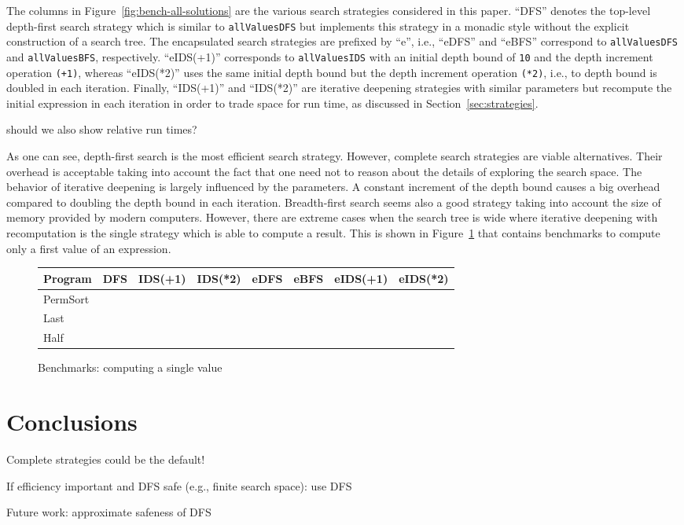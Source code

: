 \documentclass[english]{lni}
\newcommand{\code}[1]{\texttt{\small{}#1}}
\begin{document}
The columns in Figure~\ref{fig:bench-all-solutions}
are the various search strategies considered in this paper.
``DFS'' denotes the top-level depth-first search strategy
which is similar to \code{allValuesDFS} but implements
this strategy in a monadic style without the explicit
construction of a search tree.
The encapsulated search strategies are prefixed by ``e'',
i.e., ``eDFS'' and ``eBFS'' correspond to \code{allValuesDFS}
and \code{allValuesBFS}, respectively.
``eIDS(+1)'' corresponds to \code{allValuesIDS}
with an initial depth bound of \code{10} and the depth increment
operation \code{(+1)}, whereas ``eIDS(*2)'' uses the same initial depth bound
but the depth increment operation \code{(*2)}, i.e., to depth bound
is doubled in each iteration.
Finally, ``IDS(+1)'' and ``IDS(*2)'' are iterative deepening
strategies with similar parameters but recompute the initial
expression in each iteration in order to trade space for run time,
as discussed in Section~\ref{sec:strategies}.

{\sc should we also show relative run times?}

As one can see, depth-first search is the most efficient
search strategy.
However, complete search strategies are viable alternatives.
Their overhead is acceptable taking into account the fact
that one need not to reason about the details of exploring the
search space. The behavior of iterative deepening is largely
influenced by the parameters.
A constant increment of the depth bound causes a big overhead
compared to doubling the depth bound in each iteration.
Breadth-first search seems also a good strategy
taking into account the size of memory provided by modern computers.
However, there are extreme cases when the search tree is wide
where iterative deepening with recomputation is the single
strategy which is able to compute a result.
This is shown in Figure~\ref{fig:bench-first-solution}
that contains benchmarks to compute only a first value
of an expression.

\begin{figure}[ht]
\centering
\begin{tabular}{|@{~~}l@{~~}|*{7}{@{~~}r@{~~}|}}
\hline
Program &   DFS  & IDS(+1) & IDS(*2) & eDFS & eBFS & eIDS(+1) & eIDS(*2) \\\hline
PermSort  &     \\
Last      &     \\
Half      &     \\
\hline
\end{tabular}
\caption{Benchmarks: computing a single value}
\label{fig:bench-first-solution}
\end{figure}


\section{Conclusions}
\label{sec:conclusions}

Complete strategies could be the default!

If efficiency important and DFS safe (e.g., finite search space): use DFS

Future work: approximate safeness of DFS


%

\end{document}
